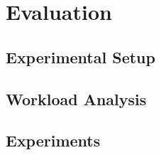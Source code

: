 \section{Evaluation}

\subsection{Experimental Setup}
\subsection{Workload Analysis}
\subsection{Experiments}
